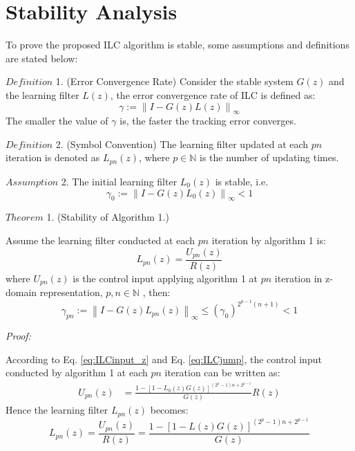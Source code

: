 \documentclass[a4paper, 12pt, twoside, openright]{mythesis}
\begin{document}
\section{Stability Analysis}
\label{sec: Stability Analysis}


To prove the proposed ILC algorithm is stable, some assumptions and definitions are stated below:
 

{$Definition$ 1.} (Error Convergence Rate)
 Consider the stable system $G(z)$ and the learning filter $L(z)$, the error convergence rate of ILC is defined as:
\begin{equation} 
\gamma := \left \| I-G(z)L(z) \right \|_\infty
\label{eq: ConvRate}
\end{equation} 
The smaller the value of $\gamma$ is, the faster the tracking error converges. 

{$Definition$ 2.} (Symbol Convention)
The learning filter updated at each $pn$ iteration is denoted as $L_{pn}(z)$, where $p\in\mathbb{N}$ is the number of updating times.

{$Assumption$ 2.}
The initial learning filter $L_0(z)$ is stable, 
i.e.
\begin{equation} 
\gamma_{0} := \left \| I-G(z)L_0(z) \right \|_\infty<1
\label{eq:asump2}
\end{equation} 

{$Theorem$ 1.} (Stability of Algorithm 1.)

Assume the learning filter conducted at each $pn$ iteration by algorithm 1 is:
\begin{equation}
L_{pn}(z)=\frac{U_{pn}(z)}{R(z)}
\end{equation} 
where $U_{pn}(z)$ is the control input applying algorithm 1 at $pn$ iteration in z-domain representation, $p, n\in\mathbb{N}$ , then:
\begin{equation} 
\gamma_{pn} := \left \| I-G(z)L_{pn}(z) \right \|_\infty\leq (\gamma_0)^{2^{p-1}(n+1)}<1
\end{equation} 

\textit{Proof:}

According to Eq. \ref{eq:ILCinput_z} and Eq. \ref{eq:ILCjump}, the control input conducted by algorithm 1 at each $pn$ iteration can be written as:
\begin{align}
U_{pn}(z) &=\frac{1-[1-L_0(z)G(z)]^{(2^p-1)n+2^{p-1}}}{G(z)}R(z)
\end{align}
Hence the learning filter $L_{pn}(z)$ becomes:
\begin{equation}
L_{pn}(z) =\frac{U_{pn}(z)}{R(z)}=\frac{1-[1-L(z)G(z)]^{(2^p-1)n+2^{p-1}}}{G(z)}
\label{eq: AcceleLearnFilter}
\end{equation}
\end{document}
